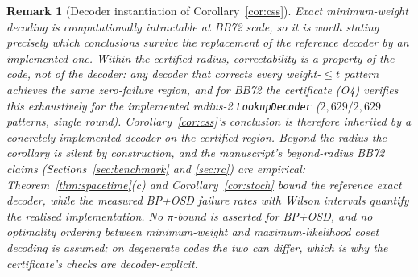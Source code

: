 \documentclass[pdflatex,sn-mathphys-num]{sn-jnl}
\theoremstyle{thmstyleone}
\theoremstyle{thmstyletwo}
\newtheorem{remark}{Remark}
\theoremstyle{thmstylethree}
\begin{document}
\begin{remark}[Decoder instantiation of Corollary~\ref{cor:css}]\label{rem:decoder-inst}
Exact minimum-weight decoding is computationally intractable at BB72 scale, so it is worth stating precisely which conclusions survive the replacement of the reference decoder by an implemented one. \emph{Within the certified radius}, correctability is a property of the code, not of the decoder: any decoder that corrects every weight-$\le t$ pattern achieves the same zero-failure region, and for BB72 the certificate (O4) verifies this exhaustively for the implemented radius-2 \texttt{LookupDecoder} ($2{,}629/2{,}629$ patterns, single round). Corollary~\ref{cor:css}'s conclusion is therefore inherited by a concretely implemented decoder on the certified region. \emph{Beyond the radius} the corollary is silent by construction, and the manuscript's beyond-radius BB72 claims (Sections~\ref{sec:benchmark} and \ref{sec:rc}) are empirical: Theorem~\ref{thm:spacetime}(c) and Corollary~\ref{cor:stoch} bound the reference exact decoder, while the measured BP+OSD failure rates with Wilson intervals quantify the realised implementation. No $\pi$-bound is asserted for BP+OSD, and no optimality ordering between minimum-weight and maximum-likelihood coset decoding is assumed; on degenerate codes the two can differ, which is why the certificate's checks are decoder-explicit.
\end{remark}
\end{document}
